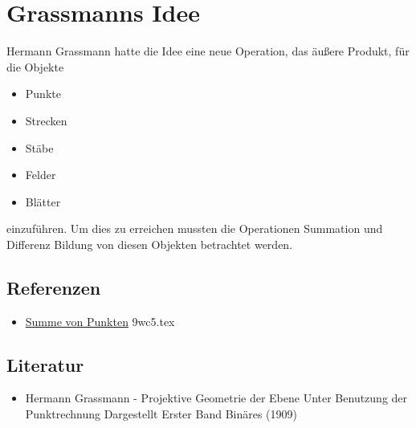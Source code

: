 \documentclass{sajzk}
\begin{document}
\section{Grassmanns Idee}
\label{16ea}

Hermann Grassmann hatte die Idee eine neue Operation, das äußere Produkt, für die Objekte

\begin{itemize}
    \item Punkte
    \item Strecken
    \item Stäbe
    \item Felder
    \item Blätter
\end{itemize}

einzuführen. Um dies zu erreichen mussten die Operationen Summation und
Differenz Bildung von diesen Objekten betrachtet werden.

\subsection{Referenzen}
\begin{itemize}
    \item \href{9wc5.pdf}{Summe von Punkten} 9wc5.tex
\end{itemize}

\subsection{Literatur}
\begin{itemize}
    \item Hermann Grassmann - Projektive Geometrie der Ebene Unter Benutzung der Punktrechnung Dargestellt Erster Band Binäres (1909)
\end{itemize}
\end{document}
